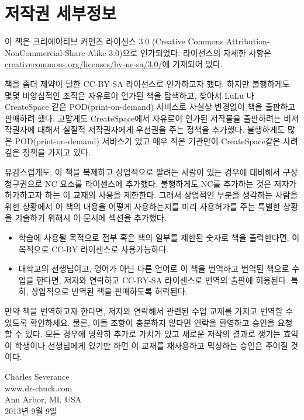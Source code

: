 
\chapter{저작권 세부정보}

이 책은 크리에이티브 커먼즈 라이선스 3.0 (Creative Commons Attribution-NonCommercial-Share Alike 3.0)으로 인가되었다.
라이선스의 자세한 사항은 \url{creativecommons.org/licenses/by-nc-sa/3.0/}에 기재되어 있다.

책을 좀더 제약이 덜한 CC-BY-SA 라이선스로 인가하고자 했다. 하지만 불행하게도 몇몇 비양심적인 조직은
자유로이 인가된 책을 탐색하고, 찾아서 LuLu 나 CreateSpace 같은 POD(print-on-demand) 서비스로 사실상 변경없이 책을 출판하고 판매하려 했다.
고맙게도 CreateSpace에서 자유로이 인가된 저작물을 출판하려는 비저작권자에 대해서 실질적 저작권자에게 우선권을 주는 정책을 추가했다.
불행하게도 많은 POD(print-on-demand) 서비스가 있고 매우 적은 기관만이 CreateSpace같은 사려 깊은 정책을 가지고 있다.

유감스럽게도, 이 책을 복제하고 상업적으로 팔려는 사람이 있는 경우에 대비해서 구상청구권으로 NC 요소를 라이센스에 추가했다.
불행하게도 NC를 추가하는 것은 저자가 허가하고자 하는 이 교재의 사용을 제한한다.
그래서 상업적인 부분을 생각하는 사람을 위한 상황에서 이 책의 내용을 어떻게 사용하는지를 미리 사용허가를 주는
특별한 상황을 기술하기 위해서 이 문서에 섹션을 추가했다.

\begin{itemize}
\item 학습에 사용될 목적으로 전부 혹은 책의 일부를 제한된 숫자로 책을 출력한다면, 이 목적으로 CC-BY 라이센스로 사용가능하다.

\item 대학교의 선생님이고, 영어가 아닌 다른 언어로 이 책을 번역하고 번역된 책으로 수업을 한다면,
저자와 연락하고 CC-BY-SA 라이센스로 번역의 출판에 허용된다. 특히, 상업적으로 번역된 책을 판매하도록 허락된다.
\end{itemize}

만약 책을 번역하고자 한다면, 저자와 연락해서 관련된 수업 교재를 가지고 번역할 수 있도록 확인하세요.
물론, 이들 조항이 충분하지 않다면 연락을 환영하고 승인을 요청할 수 있다. 
모든 경우에 명확히 추가로 가치가 있고 새로운 저작의 결과로 생기는 효익이 학생이나 선생님에게 있기만 하면
이 교재를 재사용하고 믹싱하는 승인은 주어질 것이다.

Charles Severance\\
www.dr-chuck.com\\
Ann Arbor, MI, USA\\
2013년 9월 9일



\normalsize

\printindex

\clearemptydoublepage



